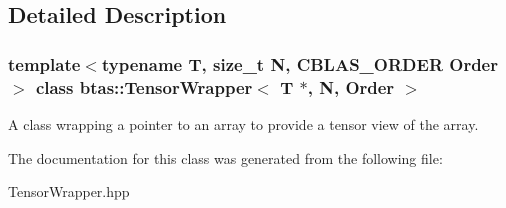 \subsection{Detailed Description}
\subsubsection*{template$<$typename T, size\_\-t N, CBLAS\_\-ORDER Order$>$ class btas::TensorWrapper$<$ T $\ast$, N, Order $>$}

A class wrapping a pointer to an array to provide a tensor view of the array. 

The documentation for this class was generated from the following file:\begin{DoxyCompactItemize}
\item 
TensorWrapper.hpp\end{DoxyCompactItemize}
